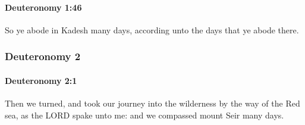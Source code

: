 		\paragraph{Deuteronomy 1:46} %
			\label{DEUTERONOMY-1-46}

			So ye abode in Kadesh many days, according unto the days that ye abode there.

	\subsubsection{Deuteronomy 2} %
		\label{DEUTERONOMY-2}

		\paragraph{Deuteronomy 2:1} %
			\label{DEUTERONOMY-2-1}

			Then we turned, and took our journey into the wilderness by the way of the Red sea, as the LORD spake unto me: and we compassed mount Seir many days.

